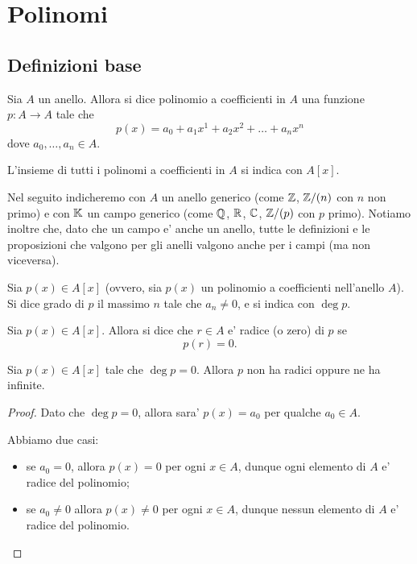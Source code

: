 \chapter{Polinomi}

\section{Definizioni base}

\begin{definition}
    Sia $A$ un anello. Allora si dice polinomio a coefficienti in $A$ una funzione $p : A \to A$ tale che \begin{equation}
        p(x) = a_0 + a_1x^1 + a_2x^2+ \dots + a_nx^n
    \end{equation}
    dove $a_0, \dots, a_n \in A$.

    L'insieme di tutti i polinomi a coefficienti in $A$ si indica con $A[x]$.
\end{definition}

Nel seguito indicheremo con $A$ un anello generico (come $\mathbb{Z}$, $\mathbb{Z}/(n)$ con $n$ non primo) e con $\mathbb{K}$ un campo generico (come $\mathbb{Q}$, $\mathbb{R}$, $\mathbb{C}$, $\mathbb{Z}/(p)$ con $p$ primo). Notiamo inoltre che, dato che un campo e' anche un anello, tutte le definizioni e le proposizioni che valgono per gli anelli valgono anche per i campi (ma non viceversa).

\begin{definition}
    Sia $p(x) \in A[x]$ (ovvero, sia $p(x)$ un polinomio a coefficienti nell'anello $A$). Si dice grado di $p$ il massimo $n$ tale che $a_n \neq 0$, e si indica con $\deg p$.
\end{definition}

\begin{definition}
    Sia $p(x) \in A[x]$. Allora si dice che $r \in A$ e' radice (o zero) di $p$ se \begin{equation}
        p(r) = 0.
    \end{equation}
\end{definition}

\begin{proposition}
    Sia $p(x) \in A[x]$ tale che $\deg p = 0$. Allora $p$ non ha radici oppure ne ha infinite.
\end{proposition}
\begin{proof}
    Dato che $\deg p = 0$, allora sara' $p(x) = a_0$ per qualche $a_0 \in A$.

    Abbiamo due casi: \begin{itemize}
        \item se $a_0 = 0$, allora $p(x) = 0$ per ogni $x \in A$, dunque ogni elemento di $A$ e' radice del polinomio;
        \item se $a_0 \neq 0$ allora $p(x) \neq 0$ per ogni $x \in A$, dunque nessun elemento di $A$ e' radice del polinomio. \qedhere
    \end{itemize}
\end{proof}


